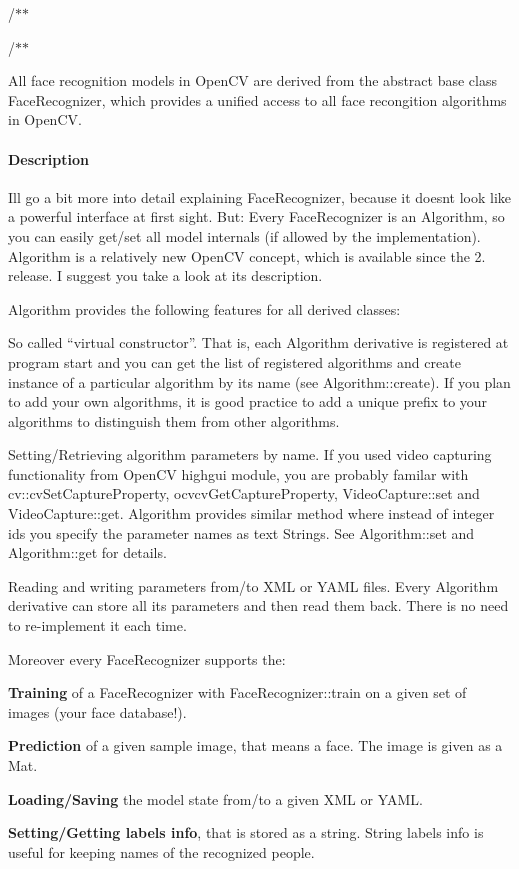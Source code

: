 /$\ast$$\ast$

/$\ast$$\ast$

All face recognition models in Open\+CV are derived from the abstract base class Face\+Recognizer, which provides a unified access to all face recongition algorithms in Open\+CV. 

\paragraph*{Description}

I\textquotesingle{}ll go a bit more into detail explaining Face\+Recognizer, because it doesn\textquotesingle{}t look like a powerful interface at first sight. But\+: Every Face\+Recognizer is an Algorithm, so you can easily get/set all model internals (if allowed by the implementation). Algorithm is a relatively new Open\+CV concept, which is available since the 2. release. I suggest you take a look at its description. 

Algorithm provides the following features for all derived classes\+: 


\begin{DoxyItemize}
\item So called “virtual constructor”. That is, each Algorithm derivative is registered at program start and you can get the list of registered algorithms and create instance of a particular algorithm by its name (see Algorithm\+::create). If you plan to add your own algorithms, it is good practice to add a unique prefix to your algorithms to distinguish them from other algorithms.
\item Setting/\+Retrieving algorithm parameters by name. If you used video capturing functionality from Open\+CV highgui module, you are probably familar with cv\+::cv\+Set\+Capture\+Property, ocvcv\+Get\+Capture\+Property, Video\+Capture\+::set and Video\+Capture\+::get. Algorithm provides similar method where instead of integer id\textquotesingle{}s you specify the parameter names as text Strings. See Algorithm\+::set and Algorithm\+::get for details.
\item Reading and writing parameters from/to X\+ML or Y\+A\+ML files. Every Algorithm derivative can store all its parameters and then read them back. There is no need to re-\/implement it each time. 
\end{DoxyItemize}

Moreover every Face\+Recognizer supports the\+: 


\begin{DoxyItemize}
\item {\bfseries Training} of a Face\+Recognizer with Face\+Recognizer\+::train on a given set of images (your face database!).
\item {\bfseries Prediction} of a given sample image, that means a face. The image is given as a Mat.
\item {\bfseries Loading/\+Saving} the model state from/to a given X\+ML or Y\+A\+ML.
\item {\bfseries Setting/\+Getting labels info}, that is stored as a string. String labels info is useful for keeping names of the recognized people. 
\end{DoxyItemize}

